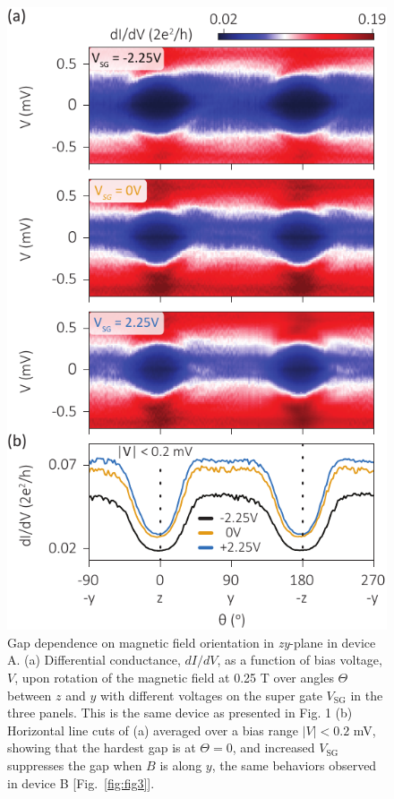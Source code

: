 \begin{figure}
\begin{center}
\centering
\includegraphics[width=0.7\columnwidth]{chapter_spinorbit/figures/SFig4_YZrot_Full1_reproduced.pdf}
\caption{\label{fig:YZrotRep}
Gap dependence on magnetic field orientation in \textit{zy}-plane in device A.
(a) Differential conductance, $dI/dV$, as a function of bias voltage, $V$, upon rotation of the magnetic field at 0.25 T over angles $\Theta$ between $z$ and $y$ with different voltages on the super gate $V_{\mathrm{SG}}$ in the three panels.
This is the same device as presented in Fig.
1 (b) Horizontal line cuts of (a) averaged over a bias range $|V| < 0.2$ mV, showing that the hardest gap is at $\Theta = 0$, and increased $V_{\mathrm{SG}}$ suppresses the gap when $B$ is along $y$, the same behaviors observed in device B [Fig.~\ref{fig:fig3}].
}
\end{center}
\end{figure}

